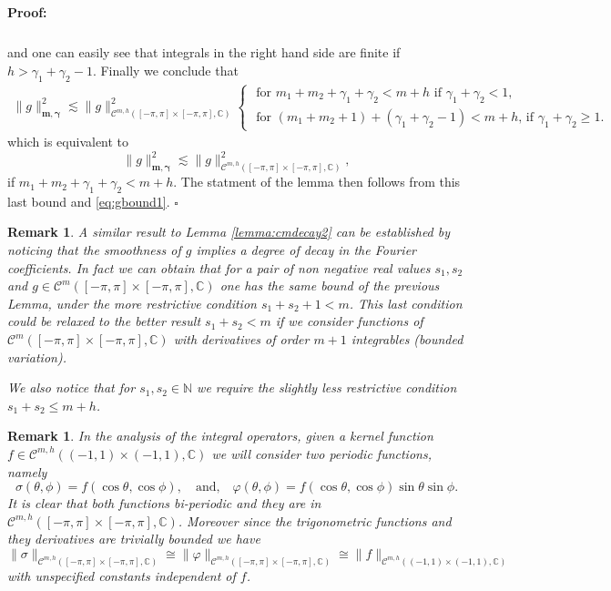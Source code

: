 \documentclass{article}
\newtheorem{remark}[theorem]{Remark}
\newenvironment{proof}{\paragraph{Proof:}}{\hfill$\square$}
\newcommand{\IC}{{\mathbb C}}
\newcommand{\IN}{{\mathbb N}}
\newcommand{\cmspace}[3]{\mathcal{C}^{#1} \left( #2, #3 \right)}
\newcommand{\cmspaceh}[4]{\mathcal{C}^{#1,#2} \left( #3, #4 \right)}
\newcommand{\iinterv}{(-1,1)\times(-1,1)}
\begin{document}
\begin{proof}
\begin{align*}
\end{align*}
and one can easily see that integrals in the right hand side are finite if $h > \gamma_1 + \gamma_2 -1$. 
Finally we conclude that 
\begin{align*}
\|g\|_{\mathbf{m},\mathbf{\gamma}}^2 \lesssim \|g\|^2_{\cmspaceh{m}{h}{[-\pi,\pi]\times[-\pi,\pi]}{\IC}}\begin{cases}
 \text{  for $m_1+m_2+\gamma_1 + \gamma_2 < m+h$ if $\gamma_1 + \gamma_2 < 1$},\\
 \text{ for $(m_1+m_2+1)+(\gamma_1+\gamma_2 -1)< m+h$, if $\gamma_1 + \gamma_2 \geq 1$}.
\end{cases}
\end{align*}
which is equivalent to 
$$
\|g\|_{\mathbf{m},\mathbf{\gamma}}^2 \lesssim \|g\|^2_{\cmspaceh{m}{h}{[-\pi,\pi]\times[-\pi,\pi]}{\IC}},
$$
if $m_1+m_2+\gamma_1+\gamma_2 < m+h$. 
The statment of the lemma then follows from this last bound and \eqref{eq:gbound1}.
\end{proof}
 
\begin{remark}
A similar result to Lemma \ref{lemma:cmdecay2} can be established by noticing that the smoothness of $g$ implies a degree of decay in the Fourier coefficients. In fact we can obtain that for a pair of non negative real values $s_1,s_2$ and $g \in \cmspace{m}{[-\pi,\pi]\times[-\pi,\pi]}{\IC}$ one has the same bound of the previous Lemma, under the more restrictive condition $s_1+s_2+1 < m$.
This last condition could be relaxed to the better result $s_1+s_2 < m$ if we consider functions of $\cmspace{m}{[-\pi,\pi]\times[-\pi,\pi]}{\IC}$ with derivatives of order $m+1$ integrables (bounded variation).

We also notice that for $s_1, s_2 \in \IN$ we require the slightly less restrictive condition $s_1+s_2 \leq m+h$.
\end{remark}

\begin{remark}
\label{rem:sigmaphi}
In the analysis of the integral operators, given a kernel function $f \in \cmspaceh{m}{h}{\iinterv}{\IC}$ we will consider two periodic functions, namely 
$$
\sigma(\theta,\phi ) = f(\cos \theta, \cos \phi), \quad \text{and,} \quad \varphi(\theta,\phi) = f(\cos \theta, \cos \phi)\sin \theta \sin \phi.
$$
It is clear that both functions bi-periodic and they are in $\cmspaceh{m}{h}{[-\pi,\pi]\times[-\pi,\pi]}{\IC}$. Moreover since the trigonometric functions and they derivatives are trivially bounded we have
$$
\| \sigma \|_{\cmspaceh{m}{h}{[-\pi,\pi]\times[-\pi,\pi]}{\IC}} \cong \| \varphi \|_{\cmspaceh{m}{h}{[-\pi,\pi]\times[-\pi,\pi]}{\IC}} \cong \|f\|_{\cmspaceh{m}{h}{\iinterv}{\IC}}
$$ 
with unspecified constants independent of $f$. 
\end{remark}
\end{document}
